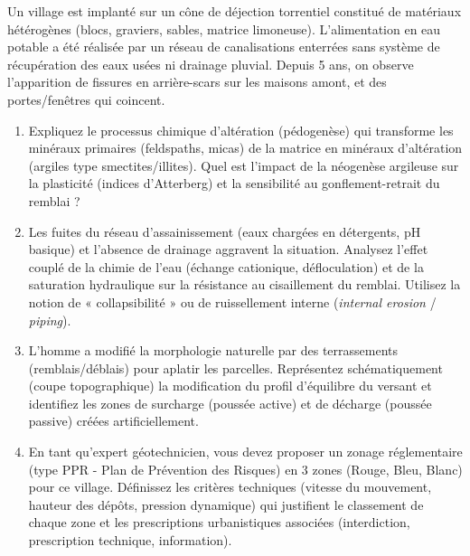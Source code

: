 \documentclass[11pt]{article}
\begin{document}
\begin{exercice}
Un village est implanté sur un cône de déjection torrentiel constitué de matériaux hétérogènes (blocs, graviers, sables, matrice limoneuse). L'alimentation en eau potable a été réalisée par un réseau de canalisations enterrées sans système de récupération des eaux usées ni drainage pluvial. Depuis 5 ans, on observe l'apparition de fissures en arrière-scars sur les maisons amont, et des portes/fenêtres qui coincent.

\begin{enumerate}
    \item Expliquez le processus chimique d'altération (pédogenèse) qui transforme les minéraux primaires (feldspaths, micas) de la matrice en minéraux d'altération (argiles type smectites/illites). Quel est l'impact de la néogenèse argileuse sur la plasticité (indices d'Atterberg) et la sensibilité au gonflement-retrait du remblai ?
    \item Les fuites du réseau d'assainissement (eaux chargées en détergents, pH basique) et l'absence de drainage aggravent la situation. Analysez l'effet couplé de la chimie de l'eau (échange cationique, défloculation) et de la saturation hydraulique sur la résistance au cisaillement du remblai. Utilisez la notion de « collapsibilité » ou de ruissellement interne (\textit{internal erosion} / \textit{piping}).
    \item L'homme a modifié la morphologie naturelle par des terrassements (remblais/déblais) pour aplatir les parcelles. Représentez schématiquement (coupe topographique) la modification du profil d'équilibre du versant et identifiez les zones de surcharge (poussée active) et de décharge (poussée passive) créées artificiellement.
    \item En tant qu'expert géotechnicien, vous devez proposer un zonage réglementaire (type PPR - Plan de Prévention des Risques) en 3 zones (Rouge, Bleu, Blanc) pour ce village. Définissez les critères techniques (vitesse du mouvement, hauteur des dépôts, pression dynamique) qui justifient le classement de chaque zone et les prescriptions urbanistiques associées (interdiction, prescription technique, information).
\end{enumerate}
\end{exercice}
\end{document}
